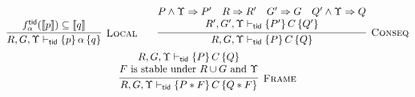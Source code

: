 \begin{figure}[t]
{\figfontsize
\[
\begin{array}{@{}c@{}}
\infer[\textsc{Local}]{
R, G, \Upsilon \vdash_\ltid \{p\}\,\alpha\,\{q\}
}{
f_\alpha^{\ltid}(\db{p})\subseteq \db{q}
}
\longonly{
\\[5pt]
\infer[\textsc{Disj}]{
R, G, \Upsilon \vdash_\ltid \{P_1 \vee P_2\}\,C\,\{Q_1 \vee Q_2\}
}{
R, G, \Upsilon \vdash_\ltid \{P_1\}\,C\,\{Q_1\} 
&
R,G, \Upsilon \vdash_\ltid \{P_2\}\, C\,\{Q_2\}
}
\\[7pt]
\infer[\textsc{Conj}]{
R,G, \Upsilon \vdash_\ltid \{P_1 \land P_2\}\,C\,\{Q_1 \land Q_2\} \quad
}{
R,G, \Upsilon \vdash_\ltid \{P_1\}\,C\,\{Q_2\}
\quad
R,G, \Upsilon \vdash_\ltid \{P_2\}\,C\,\{Q_2\}
}
\\[7pt]
\infer{
R,G, \Upsilon \vdash_\ltid \{\exists x.\, P\}\,C\,\{\exists x.\, Q\}
}{
R,G, \Upsilon \vdash_\ltid \{P\}\,C\,\{Q\}
}\quad
\infer{
R,G, \Upsilon \vdash_\ltid \{\forall x.\, P\}\,C\,\{\forall x.\, Q\}
}{
R,G, \Upsilon \vdash_\ltid \{P\}\,C\,\{Q\} 
}
\\[2pt]
\multicolumn{1}{@{}r@{}}{
\textsc{Exists}_1 
\qquad \qquad 
\qquad \qquad 
\qquad 
\textsc{Forall}_1
\quad \,
}
\\[5pt]
}
\qquad
\infer[\textsc{Conseq}]{
R, G,\Upsilon \vdash_\ltid \{P\}\,C\,\{Q\}
}{
\begin{array}{@{}c@{}}
P \wedge \Upsilon \Rightarrow P' \quad R \Rightarrow R' \quad
G' \Rightarrow G \quad Q' \wedge \Upsilon \Rightarrow Q
\\%
 R', G',\Upsilon \vdash_\ltid \{P'\}\,C\,\{Q'\} 
\end{array}
}
\\[5pt]
\infer[\textsc{Frame}]{
R, G, \Upsilon \vdash_\ltid \{P*F\}\,C\,\{Q*F\}
}{
\begin{array}{@{}c@{}}
R, G, \Upsilon \vdash_\ltid \{P\}\,C\,\{Q\}
\\ %
F \mbox{ is stable under $R \cup G$ and $\Upsilon$}

\end{array}}
\end{array}\]}
\end{figure}
